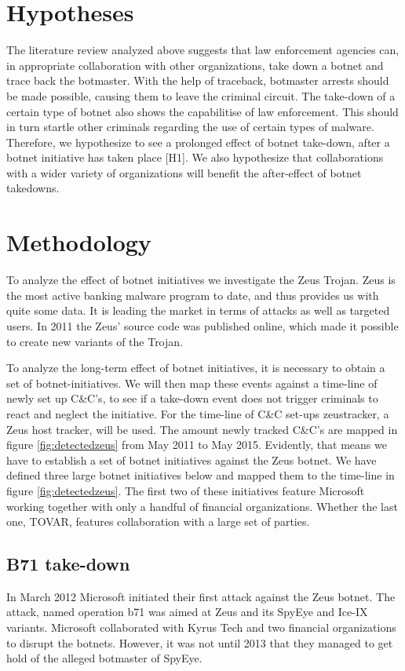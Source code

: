 \documentclass{sig-alternate-br}
\begin{document}
\section{Hypotheses}
The literature review analyzed above suggests that law enforcement agencies can, in appropriate collaboration with other organizations, take down a botnet and trace back the botmaster. With the help of traceback, botmaster arrests should be made possible, causing them to leave the criminal circuit. The take-down of a certain type of botnet also shows the capabilitise of law enforcement. This should in turn startle other criminals regarding the use of certain types of malware. Therefore, we hypothesize to see a prolonged effect of botnet take-down, after a botnet initiative has taken place [H1]. We also hypothesize that collaborations with a wider variety of organizations will benefit the after-effect of botnet takedowns.

\section{Methodology}
To analyze the effect of botnet initiatives we investigate the Zeus Trojan. Zeus is the most active banking malware program to date, and thus provides us with quite some data. It is leading the market in terms of attacks as well as targeted users. In 2011 the Zeus' source code was published online, which made it possible to create new variants of the Trojan.

To analyze the long-term effect of botnet initiatives, it is necessary to obtain a set of botnet-initiatives. We will then map these events against a time-line of newly set up C\&C's, to see if a take-down event does not trigger criminals to react and neglect the initiative. For the time-line of C\&C set-ups zeustracker\footnotemark, a Zeus host tracker, will be used. The amount newly tracked C\&C's are mapped in figure \ref{fig:detectedzeus} from May 2011 to May 2015. Evidently, that means we have to establish a set of botnet initiatives against the Zeus botnet. We have defined three large botnet initiatives below and mapped them to the time-line in figure \ref{fig:detectedzeus}. The first two of these initiatives feature Microsoft working together with only a handful of financial organizations. Whether the last one, TOVAR, features collaboration with a large set of parties.


\subsection{B71 take-down}
In March 2012 Microsoft initiated their first attack against the Zeus botnet. The attack, named operation b71 was aimed at Zeus and its SpyEye and Ice-IX variants. Microsoft collaborated with Kyrus Tech and two financial organizations to disrupt the botnets. However, it was not until 2013 that they managed to get hold of the alleged botmaster of SpyEye.
\end{document}
